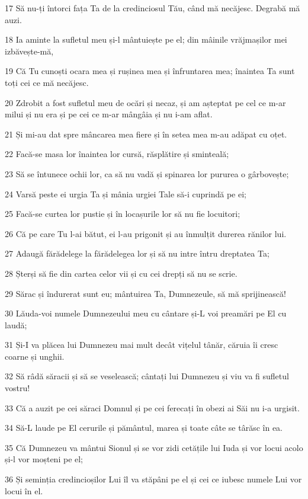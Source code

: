 \par 17 Să nu-ți întorci fața Ta de la credinciosul Tău, când mă necăjesc. Degrabă mă auzi.
\par 18 Ia aminte la sufletul meu și-l mântuiește pe el; din mâinile vrăjmașilor mei izbăvește-mă,
\par 19 Că Tu cunoști ocara mea și rușinea mea și înfruntarea mea; înaintea Ta sunt toți cei ce mă necăjesc.
\par 20 Zdrobit a fost sufletul meu de ocări și necaz, și am așteptat pe cel ce m-ar milui și nu era și pe cei ce m-ar mângâia și nu i-am aflat.
\par 21 Și mi-au dat spre mâncarea mea fiere și în setea mea m-au adăpat cu oțet.
\par 22 Facă-se masa lor înaintea lor cursă, răsplătire și sminteală;
\par 23 Să se întunece ochii lor, ca să nu vadă și spinarea lor pururea o gârbovește;
\par 24 Varsă peste ei urgia Ta și mânia urgiei Tale să-i cuprindă pe ei;
\par 25 Facă-se curtea lor pustie și în locașurile lor să nu fie locuitori;
\par 26 Că pe care Tu l-ai bătut, ei l-au prigonit și au înmulțit durerea rănilor lui.
\par 27 Adaugă fărădelege la fărădelegea lor și să nu intre întru dreptatea Ta;
\par 28 Șterși să fie din cartea celor vii și cu cei drepți să nu se scrie.
\par 29 Sărac și îndurerat sunt eu; mântuirea Ta, Dumnezeule, să mă sprijinească!
\par 30 Lăuda-voi numele Dumnezeului meu cu cântare și-L voi preamări pe El cu laudă;
\par 31 Și-I va plăcea lui Dumnezeu mai mult decât vițelul tânăr, căruia îi cresc coarne și unghii.
\par 32 Să râdă săracii și să se veselească; cântați lui Dumnezeu și viu va fi sufletul vostru!
\par 33 Că a auzit pe cei săraci Domnul și pe cei ferecați în obezi ai Săi nu i-a urgisit.
\par 34 Să-L laude pe El cerurile și pământul, marea și toate câte se târăsc în ea.
\par 35 Că Dumnezeu va mântui Sionul și se vor zidi cetățile lui Iuda și vor locui acolo și-l vor moșteni pe el;
\par 36 Și seminția credincioșilor Lui îl va stăpâni pe el și cei ce iubesc numele Lui vor locui în el.

